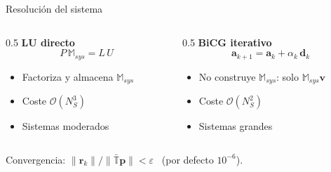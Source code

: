 \documentclass[aspectratio=43,11pt]{beamer}
\begin{document}
\begin{frame}{Resolución del sistema}
  \vspace{6pt}
  \begin{columns}[T]
    \begin{column}{0.5\textwidth}
      \textbf{\color{oro}LU directo}
      \vspace{3pt}
      \begin{equation*}
        P\,\mathbb{M}_{sys} = L\,U
      \end{equation*}
      \begin{itemize}\footnotesize
        \item Factoriza y almacena $\mathbb{M}_{sys}$
        \item Coste $\mathcal{O}(N_S^{3})$
        \item Sistemas moderados
      \end{itemize}
    \end{column}
    \begin{column}{0.5\textwidth}
      \textbf{\color{oro}BiCG iterativo}
      \vspace{3pt}
      \begin{equation*}
        \mathbf{a}_{k+1} = \mathbf{a}_k + \alpha_k\,\mathbf{d}_k
      \end{equation*}
      \begin{itemize}\footnotesize
        \item No construye $\mathbb{M}_{sys}$: solo $\mathbb{M}_{sys}\mathbf{v}$
        \item Coste $\mathcal{O}(N_S^{2})$
        \item Sistemas grandes
      \end{itemize}
    \end{column}
  \end{columns}
  \vspace{6pt}
  \begin{center}
    {\footnotesize\color{pizarra2} Convergencia: $\|\mathbf{r}_k\|/\|\bar{\mathbb{T}}\mathbf{p}\| < \varepsilon$ \ (por defecto $10^{-6}$).}
  \end{center}
\end{frame}
\end{document}
